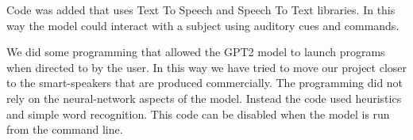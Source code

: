 Code was added that uses Text To Speech and Speech To Text libraries. In this way the model could
interact with a subject using auditory cues and commands.

We did some programming that allowed the GPT2 model to launch programs when directed to by
the user. In this way we have tried to move our project closer to the smart-speakers that
are produced commercially. The programming did not rely on the neural-network aspects of the
model. Instead the code used heuristics and simple word recognition. This code can be disabled
when the model is run from the command line.


